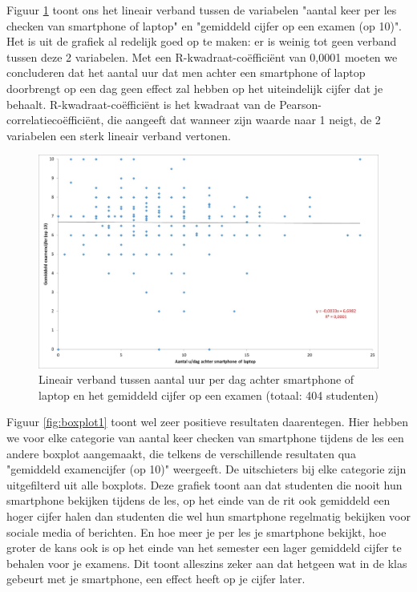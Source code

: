 Figuur \ref{fig:scatter1} toont ons het lineair verband tussen de variabelen "aantal keer per les checken van smartphone of laptop" en "gemiddeld cijfer op een examen (op 10)". Het is uit de grafiek al redelijk goed op te maken: er is weinig tot geen verband tussen deze 2 variabelen. Met een R-kwadraat-coëfficiënt van 0,0001 moeten we concluderen dat het aantal uur dat men achter een smartphone of laptop doorbrengt op een dag geen effect zal hebben op het uiteindelijk cijfer dat je behaalt. R-kwadraat-coëfficiënt is het kwadraat van de Pearson-correlatiecoëfficiënt, die aangeeft dat wanneer zijn waarde naar 1 neigt, de 2 variabelen een sterk lineair verband vertonen. 

\begin{figure}
	\includegraphics[width=\textwidth]
	{img/Scatter1.jpg}
	\caption{Lineair verband tussen aantal uur per dag achter smartphone of laptop en het gemiddeld cijfer op een examen (totaal: 404 studenten)}
	\label{fig:scatter1}
\end{figure}

Figuur \ref{fig:boxplot1} toont wel zeer positieve resultaten daarentegen. Hier hebben we voor elke categorie van aantal keer checken van smartphone tijdens de les een andere boxplot aangemaakt, die telkens de verschillende resultaten qua "gemiddeld examencijfer (op 10)" weergeeft. De uitschieters bij elke categorie zijn uitgefilterd uit alle boxplots. Deze grafiek toont aan dat studenten die nooit hun smartphone bekijken tijdens de les, op het einde van de rit ook gemiddeld een hoger cijfer halen dan studenten die wel hun smartphone regelmatig bekijken voor sociale media of berichten. En hoe meer je per les je smartphone bekijkt, hoe groter de kans ook is op het einde van het semester een lager gemiddeld cijfer te behalen voor je examens. Dit toont alleszins zeker aan dat hetgeen wat in de klas gebeurt met je smartphone, een effect heeft op je cijfer later.

